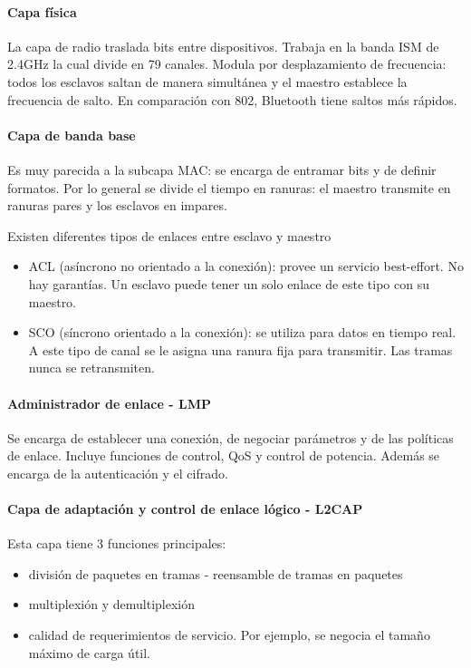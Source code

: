 \documentclass{book}
\begin{document}
	\paragraph{Capa física}
	La capa de radio traslada bits entre dispositivos. Trabaja en la banda ISM de 2.4GHz la cual divide en 79 canales. Modula por desplazamiento de frecuencia: todos los esclavos saltan de manera simultánea y el maestro establece la frecuencia de salto. En comparación con 802, Bluetooth tiene saltos más rápidos.
	
	\paragraph{Capa de banda base}
	Es muy parecida a la subcapa MAC: se encarga de entramar bits y de definir formatos. Por lo general se divide el tiempo en ranuras: el maestro transmite en ranuras pares y los esclavos en impares.
	
	\vspace{3mm}
	Existen diferentes tipos de enlaces entre esclavo y maestro
	
	\begin{itemize}
		\item ACL (asíncrono no orientado a la conexión): provee un servicio best-effort. No hay garantías. Un esclavo puede tener un solo enlace de este tipo con su maestro.
		\item SCO (síncrono orientado a la conexión): se utiliza para datos en tiempo real. A este tipo de canal se le asigna una ranura fija para transmitir. Las tramas nunca se retransmiten.
	\end{itemize}
	
	\paragraph{Administrador de enlace - LMP}
	Se encarga de establecer una conexión, de negociar parámetros y de las políticas de enlace. Incluye funciones de control, QoS y control de potencia. Además se encarga de la autenticación y el cifrado.
	
	\paragraph{Capa de adaptación y control de enlace lógico - L2CAP}
	Esta capa tiene 3 funciones principales:
	
	\begin{itemize}
		\item división de paquetes en tramas - reensamble de tramas en paquetes
		\item multiplexión y demultiplexión
		\item calidad de requerimientos de servicio. Por ejemplo, se negocia el tamaño máximo de carga útil.
	\end{itemize}
	
\end{document}
